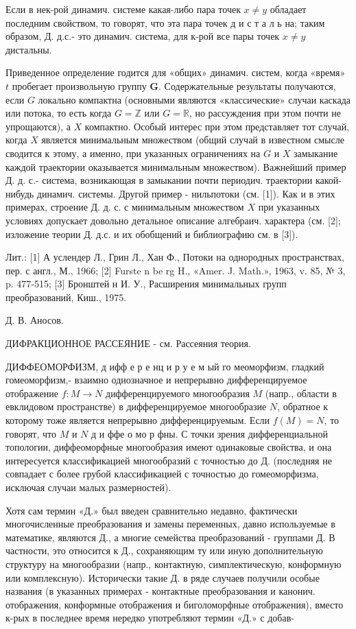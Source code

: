 \documentclass[10pt]{article}
\begin{document}
Если в нек-рой динамич. системе какая-либо пара точек $x \neq y$ обладает последним свойством, то говорят, что эта пара точек д и с т а л ь на; таким образом, Д. д.с.- это динамич. система, для к-рой все пары точек $x \neq y$ дистальны.



Приведенное определение годится для «общих» динамич. систем, когда «время» $t$ пробегает произвольную группу $\boldsymbol{G}$. Содержательные результаты получаются, если $G$ локально компактна (основными являются «классические» случаи каскада или потока, то есть когда $G=\mathbb{Z}$ или $G=\mathbb{R}$, но рассуждения при этом почти не упрощаются), а $X$ компактно. Особый интерес при этом представляет тот случай, когда $X$ является минимальным множеством (общий случай в известном смысле сводится к этому, а именно, при указанных ограничениях на $G$ и $X$ замыкание каждой траектории оказывается минимальным множеством). Важнейший пример Д. д. с.- система, возникающая в замыкании почти периодич. траектории какой-нибудь динамич. системы. Другой пример - нильпотоки (см. [1]). Как и в этих примерах, строение Д. д. с. с минимальным множеством $X$ при указанных условиях допускает довольно детальное описание алгебраич. характера (см. [2]; изложение теории Д. д.с. и их обобщений и библиографию см. в [3]).



Лит.: [1] А услендер Л., Грин Л., Хан Ф., Потоки на однородных пространствах, пер. с англ., М., 1966; [2] Furste n be rg H., «Amer. J. Math.», 1963, v. 85, № 3, p. 477-515; [3] Бронштей н И. У., Расширения минимальных групп преобразований, Киш., 1975.



Д. В. Аносов.



ДИФРАКЦИОННОЕ РАССЕЯНИЕ - см. Рассеяния теория.



ДИФФЕОМОРФИЗМ, д ифф е р е нц и р у е м ый го меоморфизм, гладкий гомеоморфизм,- взаимно однозначное и непрерывно дифференцируемое отображение $f: M \rightarrow N$ дифференцируемого многообразия $M$ (напр., области в евклидовом пространстве) в дифференцируемое многообразие $N$, обратное к которому тоже является непрерывно дифференцируемым. Если $f(M)=N$, то говорят, что $M$ и $N$ д и ффе о мо р фны. С точки зрения дифференциальной топологии, диффеоморфные многообразия имеют одинаковые свойства, и она интересуется классификацией многообразий с точностью до Д. (последняя не совпадает с более грубой классификацией с точностью до гомеоморфизма, исключая случаи малых размерностей).



Хотя сам термин «Д.» был введен сравнительно недавно, фактически многочисленные преобразования и замены переменных, давно используемые в математике, являются Д., а многие семейства преобразований - группами Д. В частности, это относится к Д., сохраняющим ту или иную дополнительную структуру на многообразии (напр., контактную, симплектическую, конформную или комплексную). Исторически такие Д. в ряде случаев получили особые названия (в указанных примерах - контактные преобразования и канонич. отображения, конформные отображения и биголоморфные отображения), вместо к-рых в последнее время нередко употребляют термин «Д.» с добав-
\end{document}
